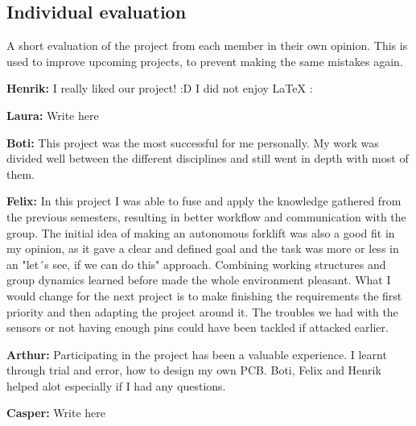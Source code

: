 \documentclass[../report.tex]{subfiles}
\begin{document}
\subsection{Individual evaluation}
A short evaluation of the project from each member in their own opinion. This is used to improve
upcoming projects, to prevent making the same mistakes again.

\textbf{Henrik:}
I really liked our project! :D I did not enjoy LaTeX :%

\textbf{Laura:}
Write here

\textbf{Boti:}
This project was the most successful for me personally. My work was divided well between the different disciplines
and still went in depth with most of them.

\textbf{Felix:}
In this project I was able to fuse and apply the knowledge gathered from the previous semesters, resulting in better 
workflow and communication with the group. The initial idea of making an autonomous forklift was also a good fit 
in my opinion, as it gave a clear and defined goal and the task was more or less in an "let´s see, if we can do this" 
approach. Combining working structures and group dynamics learned before made the whole environment pleasant.  What I would 
change for the next project is to make finishing the requirements the first priority and then adapting the project around it. 
The troubles we had with the sensors or not having enough pins could have been tackled if attacked earlier.



\textbf{Arthur:}
Participating in the project has been a valuable experience. I learnt through trial and error, how to design my own PCB. Boti, Felix and Henrik helped alot especially if I had any questions. 


\textbf{Casper:}
Write here
\end{document}
